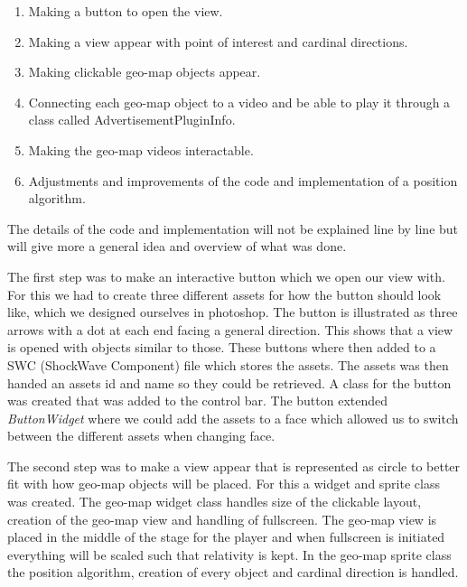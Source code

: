 \begin{enumerate}
\item Making a button to open the view.

\item Making a view appear with point of interest and cardinal directions.

\item Making clickable geo-map objects appear.

\item Connecting each geo-map object to a video and be able to play it through a class called AdvertisementPluginInfo.

\item Making the geo-map videos interactable.


\item Adjustments and improvements of the code and implementation of a position algorithm. 
\end{enumerate}

The details of the code and implementation will not be explained line by line but will give more a general idea and overview of what was done.

The first step was to make an interactive button which we open our view with. For this we had to create three different assets for how the button should look like, which we designed ourselves in photoshop. The button is illustrated as three arrows with a dot at each end facing a general direction. This shows that a view is opened with objects similar to those. These buttons where then added to a SWC (ShockWave Component) file which stores the assets. The assets was then handed an assets id and name so they could be retrieved. A class for the button was created that was added to the control bar. The button extended \textit{ButtonWidget} where we could add the assets to a face which allowed us to switch between the different assets when changing face. 

The second step was to make a view appear that is represented as circle to better fit with how geo-map objects will be placed. For this a widget and sprite class was created. The geo-map widget class handles size of the clickable layout, creation of the geo-map view and handling of fullscreen. The geo-map view is placed in the middle of the stage for the player and when fullscreen is initiated everything will be scaled such that relativity is kept. In the geo-map sprite class the position algorithm, creation of every object and cardinal direction is handled.

